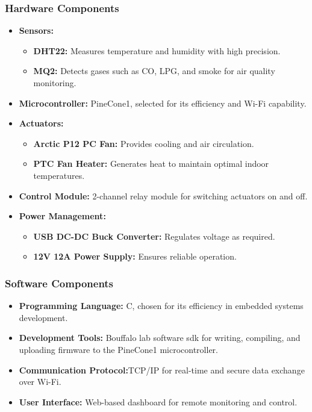 \documentclass[a4paper]{scrartcl}
\begin{document}
\subsubsection{Hardware Components}
\begin{itemize}
\item \textbf{Sensors:}
\begin{itemize}
\item \textbf{DHT22:} Measures temperature and humidity with high precision.
\item \textbf{MQ2:} Detects gases such as CO, LPG, and smoke for air quality monitoring.
\end{itemize}
\item \textbf{Microcontroller:} PineCone1, selected for its efficiency and Wi-Fi capability.
\item \textbf{Actuators:}
\begin{itemize}
\item \textbf{Arctic P12 PC Fan:} Provides cooling and air circulation.
\item \textbf{PTC Fan Heater:} Generates heat to maintain optimal indoor temperatures.
\end{itemize}
\item \textbf{Control Module:} 2-channel relay module for switching actuators on and off.
\item \textbf{Power Management:}
\begin{itemize}
\item \textbf{USB DC-DC Buck Converter:} Regulates voltage as required.
\item \textbf{12V 12A Power Supply:} Ensures reliable operation.
\end{itemize}
\end{itemize}

\subsubsection{Software Components}
\begin{itemize}
\item \textbf{Programming Language:} C, chosen for its efficiency in embedded systems development.
\item \textbf{Development Tools:}  Bouffalo lab software sdk for writing, compiling, and uploading firmware to the PineCone1 microcontroller.
\item \textbf{Communication Protocol:}TCP/IP for real-time and secure data exchange over Wi-Fi.
\item \textbf{User Interface:} Web-based dashboard for remote monitoring and control.
\end{itemize}
\end{document}
